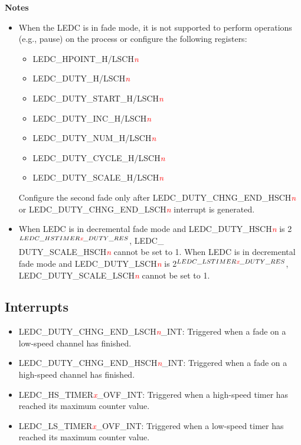 \documentclass[main\_\_EN.tex]{subfiles}
\begin{document}
{\bfseries Notes}
\begin{itemize}
\item When the LEDC is in fade mode, it is not supported to perform operations (e.g., pause) on the process or configure the following registers:
    \begin{itemize}
    \item LEDC\_HPOINT\_H/LSCH\textcolor{red}{\it{n}}
    \item LEDC\_DUTY\_H/LSCH\textcolor{red}{\it{n}}
    \item LEDC\_DUTY\_START\_H/LSCH\textcolor{red}{\it{n}}
    \item LEDC\_DUTY\_INC\_H/LSCH\textcolor{red}{\it{n}}
    \item LEDC\_DUTY\_NUM\_H/LSCH\textcolor{red}{\it{n}}
    \item LEDC\_DUTY\_CYCLE\_H/LSCH\textcolor{red}{\it{n}}
    \item LEDC\_DUTY\_SCALE\_H/LSCH\textcolor{red}{\it{n}}
    \end{itemize}
Configure the second fade only after LEDC\_DUTY\_CHNG\_END\_HSCH\textcolor{red}{\it{n}} or LEDC\_DUTY\_CHNG\_END\_LSCH\textcolor{red}{\it{n}} interrupt is generated.
\item When LEDC is in decremental fade mode and LEDC\_DUTY\_HSCH\textcolor{red}{\it{n}} is 2$ ^{LEDC\_HSTIMER\textcolor{red}{\it{x}}\_DUTY\_RES}$, LEDC\_\\DUTY\_SCALE\_HSCH\textcolor{red}{\it{n}} cannot be set to 1. When LEDC is in decremental fade mode and LEDC\_DUTY\_LSCH\textcolor{red}{\it{n}} is 2$^ {LEDC\_LSTIMER\textcolor{red}{\it{x}}\_DUTY\_RES}$, LEDC\_DUTY\_SCALE\_LSCH\textcolor{red}{\it{n}} cannot be set to 1.
\end{itemize}

\subsection{Interrupts}
\begin{itemize}
\item \label{int:LEDCDUTYCHNGENDLSCHnINT}LEDC\_DUTY\_CHNG\_END\_LSCH\textcolor{red}{\it{n}}\_INT: Triggered when a fade on a low-speed channel has finished.
\item \label{int:LEDCDUTYCHNGENDHSCHnINT}LEDC\_DUTY\_CHNG\_END\_HSCH\textcolor{red}{\it{n}}\_INT: Triggered when a fade on a high-speed channel has finished.
\item \label{int:LEDCHSTIMERxOVFINT}LEDC\_HS\_TIMER\textcolor{red}{\it{x}}\_OVF\_INT: Triggered when a high-speed timer has reached its maximum counter value.
\item \label{int:LEDCLSTIMERxOVFINT}LEDC\_LS\_TIMER\textcolor{red}{\it{x}}\_OVF\_INT: Triggered when a low-speed timer has reached its maximum counter value.
\end{itemize}
\end{document}

